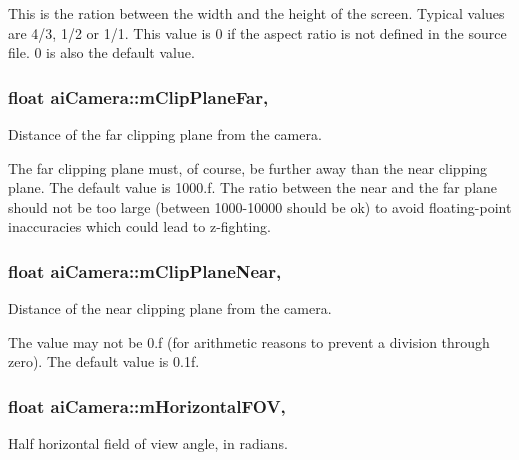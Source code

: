 This is the ration between the width and the height of the screen. Typical values are 4/3, 1/2 or 1/1. This value is 0 if the aspect ratio is not defined in the source file. 0 is also the default value. \hypertarget{structai_camera_aa9ccf77e3d7ca3dc8f46df931b65172f}{
\subsubsection[{m\+Clip\+Plane\+Far}]{\setlength{\rightskip}{0pt plus 5cm}float ai\+Camera\+::m\+Clip\+Plane\+Far\hspace{0.3cm}{\ttfamily [get]}, {\ttfamily [set]}}}\label{structai_camera_aa9ccf77e3d7ca3dc8f46df931b65172f}
Distance of the far clipping plane from the camera.

The far clipping plane must, of course, be further away than the near clipping plane. The default value is 1000.\+f. The ratio between the near and the far plane should not be too large (between 1000-\/10000 should be ok) to avoid floating-\/point inaccuracies which could lead to z-\/fighting. \hypertarget{structai_camera_a720e8c94c036dcefe4b13cc1c69c521e}{
\subsubsection[{m\+Clip\+Plane\+Near}]{\setlength{\rightskip}{0pt plus 5cm}float ai\+Camera\+::m\+Clip\+Plane\+Near\hspace{0.3cm}{\ttfamily [get]}, {\ttfamily [set]}}}\label{structai_camera_a720e8c94c036dcefe4b13cc1c69c521e}
Distance of the near clipping plane from the camera.

The value may not be 0.\+f (for arithmetic reasons to prevent a division through zero). The default value is 0.\+1f. \hypertarget{structai_camera_adcdea73ece19ea0a9068f5544ec23592}{
\subsubsection[{m\+Horizontal\+F\+O\+V}]{\setlength{\rightskip}{0pt plus 5cm}float ai\+Camera\+::m\+Horizontal\+F\+O\+V\hspace{0.3cm}{\ttfamily [get]}, {\ttfamily [set]}}}\label{structai_camera_adcdea73ece19ea0a9068f5544ec23592}
Half horizontal field of view angle, in radians.

